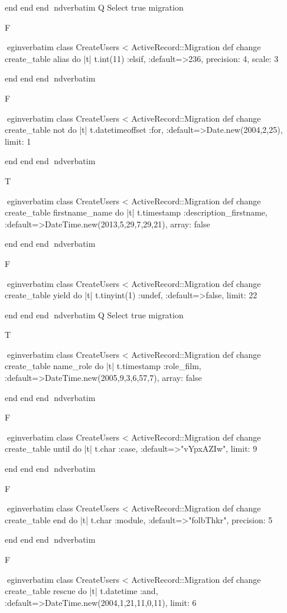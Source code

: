     end 
  end 
end
nd{verbatim}
Q
 Select true migration

F

egin{verbatim}
 class CreateUsers < ActiveRecord::Migration 
  def change 
    create_table alias do |t| 
      t.int(11) :elsif, :default=>236, precision: 4, scale: 3
    
    end 
  end 
end
nd{verbatim}

F

egin{verbatim}
 class CreateUsers < ActiveRecord::Migration 
  def change 
    create_table not do |t| 
      t.datetimeoffset :for, :default=>Date.new(2004,2,25), limit: 1
    
    end 
  end 
end
nd{verbatim}

T

egin{verbatim}
 class CreateUsers < ActiveRecord::Migration 
  def change 
    create_table firstname_name do |t| 
      t.timestamp :description_firstname, :default=>DateTime.new(2013,5,29,7,29,21), array: false
    
    end 
  end 
end
nd{verbatim}

F

egin{verbatim}
 class CreateUsers < ActiveRecord::Migration 
  def change 
    create_table yield do |t| 
      t.tinyint(1) :undef, :default=>false, limit: 22
    
    end 
  end 
end
nd{verbatim}
Q
 Select true migration

T

egin{verbatim}
 class CreateUsers < ActiveRecord::Migration 
  def change 
    create_table name_role do |t| 
      t.timestamp :role_film, :default=>DateTime.new(2005,9,3,6,57,7), array: false
    
    end 
  end 
end
nd{verbatim}

F

egin{verbatim}
 class CreateUsers < ActiveRecord::Migration 
  def change 
    create_table until do |t| 
      t.char :case, :default=>"vYpxAZIw", limit: 9
    
    end 
  end 
end
nd{verbatim}

F

egin{verbatim}
 class CreateUsers < ActiveRecord::Migration 
  def change 
    create_table end do |t| 
      t.char :module, :default=>"folbThkr", precision: 5
    
    end 
  end 
end
nd{verbatim}

F

egin{verbatim}
 class CreateUsers < ActiveRecord::Migration 
  def change 
    create_table rescue do |t| 
      t.datetime :and, :default=>DateTime.new(2004,1,21,11,0,11), limit: 6
    
